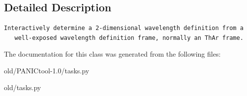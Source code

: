\subsection{Detailed Description}


\footnotesize\begin{verbatim}Interactively determine a 2-dimensional wavelength definition from a
   well-exposed wavelength definition frame, normally an ThAr frame.
\end{verbatim}
\normalsize
 



The documentation for this class was generated from the following files:\begin{CompactItemize}
\item 
old/PANICtool-1.0/tasks.py\item 
old/tasks.py\end{CompactItemize}
